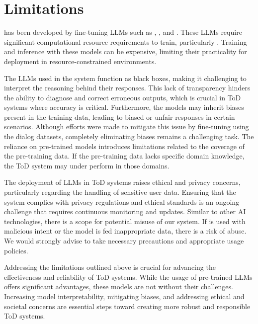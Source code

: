 \section{Limitations}

{\oursys} has been developed by fine-tuning LLMs such as {\gpt}, {\llamai}, and {\flan}. 
These LLMs require significant computational resource requirements to train, particularly {\llamai}. 
Training and inference with these models can be expensive, limiting their practicality for deployment in resource-constrained environments. 


The LLMs used in the system function as black boxes, making it challenging to interpret the reasoning behind their responses. 
This lack of transparency hinders the ability to diagnose and correct erroneous outputs, which is crucial in ToD systems where accuracy is critical. Furthermore, the models may inherit biases present in the training data, leading to biased or unfair responses in certain scenarios. 
Although efforts were made to mitigate this issue by fine-tuning using the dialog datasets, completely eliminating biases remains a challenging task. %
The reliance on pre-trained models introduces limitations related to the coverage of the pre-training data. If the pre-training data lacks specific domain knowledge, the ToD system may under perform in those domains.

The deployment of LLMs in ToD systems raises ethical and privacy concerns, particularly regarding the handling of sensitive user data. Ensuring that the system complies with privacy regulations and ethical standards is an ongoing challenge that requires continuous monitoring and updates. 
Similar to other AI technologies, there is a scope for potential misuse of our system. 
If {\oursys} is used with malicious intent or the model is fed inappropriate data, there is a risk of abuse. 
We would strongly advise to take necessary precautions and appropriate usage policies.

Addressing the limitations outlined above is crucial for advancing the effectiveness and reliability of ToD systems.
While the usage of pre-trained LLMs offers significant advantages, these models are not without their challenges. 
Increasing model interpretability, mitigating biases, and addressing ethical and societal concerns are essential steps toward creating more robust and responsible ToD systems. 

